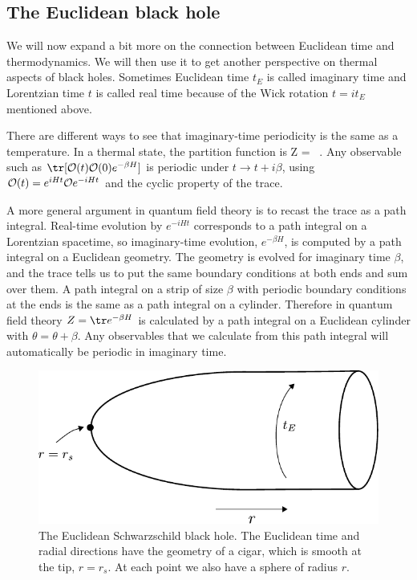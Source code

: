 \subsection{The Euclidean black hole}\label{ss:gibbonshawking}

We will now expand a bit more on the connection between Euclidean time and thermodynamics. We will then use it to get another perspective on thermal aspects of black holes. Sometimes Euclidean time $t_E$ is called imaginary time and Lorentzian time $t$ is called real time because of the Wick rotation $t = i t_E$ mentioned above.  

There are different ways to see that imaginary-time periodicity is the same as  a temperature. In a thermal state, the partition function is
\be
Z = \tr [ e^{-\beta H} ]\ .
\ee
Any observable such as $\tr[ {\cal O}(t) {\cal O}(0) e^{-\beta H}]$ is periodic under $t \to t + i \beta$, using ${\cal O}(t) = e^{i H t}{\cal O}e^{-i H t}$ and the cyclic property of the trace. 

A more general argument in quantum field theory is to recast the trace as a path integral. Real-time evolution by $e^{-i H t}$ corresponds to a path integral on a Lorentzian spacetime, so imaginary-time evolution, $e^{-\beta H}$, is computed by a path integral on a Euclidean geometry. The geometry is evolved for imaginary time $\beta$, and the trace tells us to put the same boundary conditions at both ends and sum over them. A path integral on a strip of size $\beta$ with periodic boundary conditions at the ends is the same as a path integral on a cylinder. Therefore in quantum field theory $Z = \tr e^{-\beta H}$ is calculated by a path integral on a Euclidean cylinder with $\theta = \theta  + \beta$. Any observables that we calculate from this path integral will automatically be periodic in imaginary time.

\begin{figure}
\begin{center}
\includegraphics[scale=1]{figures/cigar.pdf}
\end{center}
\caption{\small  The Euclidean Schwarzschild black hole. The Euclidean time and radial directions have the geometry of a cigar, which is smooth at the tip, $r=r_s$. At each point we also have a sphere of radius $r$. \label{fig:cigar}}
\end{figure}

